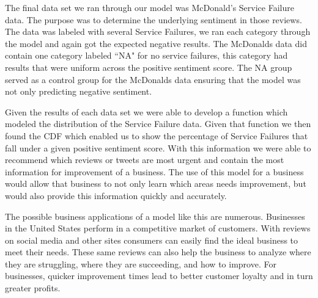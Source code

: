 \documentclass[titlepage,letterpaper]{article}
\begin{document}
The final data set we ran through our model was McDonald's Service Failure data. The purpose was to determine the underlying sentiment in those reviews. The data was labeled with several Service Failures, we ran each category through the model and again got the expected negative results. The McDonalds data did contain one category labeled ``NA" for no service failures, this category had results that were uniform across the positive sentiment score. The NA group served as a control group for the McDonalds data ensuring that the model was not only predicting negative sentiment. 

Given the results of each data set we were able to develop a function which modeled the distribution of the Service Failure data. Given that function we then found the CDF which enabled us to show the percentage of Service Failures that fall under a given positive sentiment score. With this information we were able to recommend which reviews or tweets are most urgent and contain the most information for improvement of a business. The use of this model for a business would allow that business to not only learn which areas needs improvement, but  would also provide this information quickly and accurately.

The possible business applications of a model like this are numerous. Businesses in the United States perform in a competitive market of customers. With reviews on social media and other sites consumers can easily find the ideal business to meet their needs. These same reviews can also help the business to analyze where they are struggling, where they are succeeding, and how to improve. For businesses, quicker improvement times lead to better customer loyalty and in turn greater profits.   



\clearpage 

\printbibliography
\end{document}
